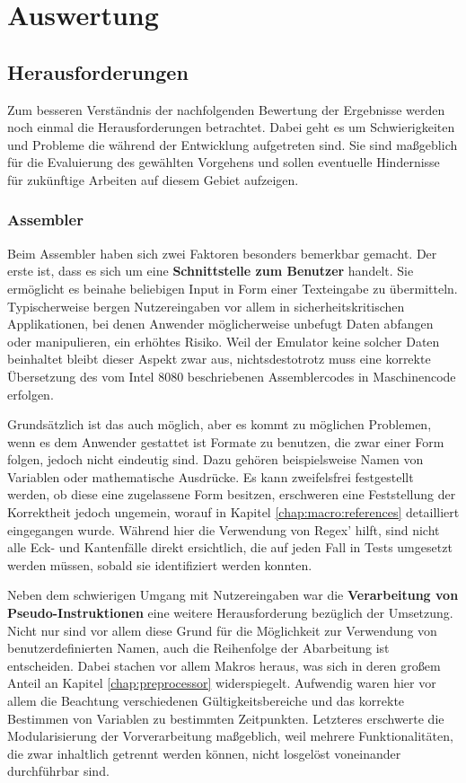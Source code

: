 \chapter{Auswertung}\label{chap:eval}

\section{Herausforderungen}

Zum besseren Verständnis der nachfolgenden Bewertung der Ergebnisse werden noch einmal die Herausforderungen betrachtet. Dabei geht es um Schwierigkeiten und Probleme die während der Entwicklung aufgetreten sind. Sie sind maßgeblich für die Evaluierung des gewählten Vorgehens und sollen eventuelle Hindernisse für zukünftige Arbeiten auf diesem Gebiet aufzeigen.

\subsection{Assembler}

Beim Assembler haben sich zwei Faktoren besonders bemerkbar gemacht. Der erste ist, dass es sich um eine \textbf{Schnittstelle zum Benutzer} handelt. Sie ermöglicht es beinahe beliebigen Input in Form einer Texteingabe zu übermitteln. Typischerweise bergen Nutzereingaben vor allem in sicherheitskritischen Applikationen, bei denen Anwender möglicherweise unbefugt Daten abfangen oder manipulieren, ein erhöhtes Risiko. Weil der Emulator keine solcher Daten beinhaltet bleibt dieser Aspekt zwar aus, nichtsdestotrotz muss eine korrekte Übersetzung des vom Intel 8080 beschriebenen Assemblercodes in Maschinencode erfolgen.

Grundsätzlich ist das auch möglich, aber es kommt zu möglichen Problemen, wenn es dem Anwender gestattet ist Formate zu benutzen, die zwar einer Form folgen, jedoch nicht eindeutig sind. Dazu gehören beispielsweise Namen von Variablen oder mathematische Ausdrücke. Es kann zweifelsfrei festgestellt werden, ob diese eine zugelassene Form besitzen, erschweren eine Feststellung der Korrektheit jedoch ungemein, worauf in Kapitel \ref{chap:macro:references} detailliert eingegangen wurde. Während hier die Verwendung von Regex' hilft, sind nicht alle Eck- und Kantenfälle direkt ersichtlich, die auf jeden Fall in Tests umgesetzt werden müssen, sobald sie identifiziert werden konnten.

Neben dem schwierigen Umgang mit Nutzereingaben war die \textbf{Verarbeitung von Pseudo-Instruktionen} eine weitere Herausforderung bezüglich der Umsetzung. Nicht nur sind vor allem diese Grund für die Möglichkeit zur Verwendung von benutzerdefinierten Namen, auch die Reihenfolge der Abarbeitung ist entscheiden. Dabei stachen vor allem Makros heraus, was sich in deren großem Anteil an Kapitel \ref{chap:preprocessor} widerspiegelt. Aufwendig waren hier vor allem die Beachtung verschiedenen Gültigkeitsbereiche und das korrekte Bestimmen von Variablen zu bestimmten Zeitpunkten. Letzteres erschwerte die Modularisierung der Vorverarbeitung maßgeblich, weil mehrere Funktionalitäten, die zwar inhaltlich getrennt werden können, nicht losgelöst voneinander durchführbar sind.

